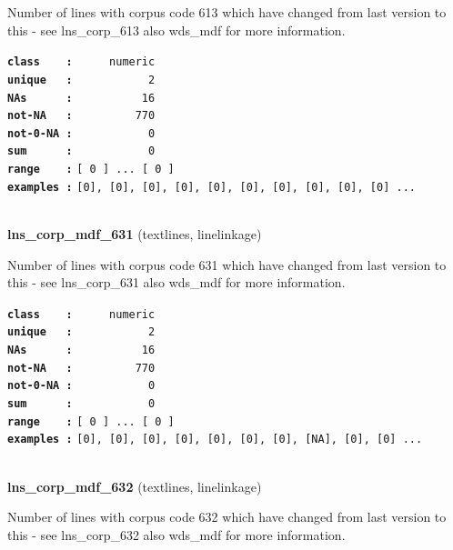 \documentclass[]{article}
\begin{document}
Number of lines with corpus code 613 which have changed from last
version to this - see lns\_corp\_613 also wds\_mdf for more information.

\textbf{\texttt{class\ \ \ \ :}} \texttt{~~~~~numeric}\\
\textbf{\texttt{unique\ \ \ :}} \texttt{~~~~~~~~~~~2}\\
\textbf{\texttt{NAs\ \ \ \ \ \ :}} \texttt{~~~~~~~~~~16}\\
\textbf{\texttt{not-NA\ \ \ :}} \texttt{~~~~~~~~~770}\\
\textbf{\texttt{not-0-NA\ :}} \texttt{~~~~~~~~~~~0}\\
\textbf{\texttt{sum\ \ \ \ \ \ :}} \texttt{~~~~~~~~~~~0}\\
\textbf{\texttt{range\ \ \ \ :}}
\texttt{{[}\ 0\ {]}\ ...\ {[}\ 0\ {]}}\\
\textbf{\texttt{examples\ :}}
\texttt{{[}0{]},\ {[}0{]},\ {[}0{]},\ {[}0{]},\ {[}0{]},\ {[}0{]},\ {[}0{]},\ {[}0{]},\ {[}0{]},\ {[}0{]}\ ...}\\

~

\textbf{lns\_corp\_mdf\_631} (textlines, linelinkage)

Number of lines with corpus code 631 which have changed from last
version to this - see lns\_corp\_631 also wds\_mdf for more information.

\textbf{\texttt{class\ \ \ \ :}} \texttt{~~~~~numeric}\\
\textbf{\texttt{unique\ \ \ :}} \texttt{~~~~~~~~~~~2}\\
\textbf{\texttt{NAs\ \ \ \ \ \ :}} \texttt{~~~~~~~~~~16}\\
\textbf{\texttt{not-NA\ \ \ :}} \texttt{~~~~~~~~~770}\\
\textbf{\texttt{not-0-NA\ :}} \texttt{~~~~~~~~~~~0}\\
\textbf{\texttt{sum\ \ \ \ \ \ :}} \texttt{~~~~~~~~~~~0}\\
\textbf{\texttt{range\ \ \ \ :}}
\texttt{{[}\ 0\ {]}\ ...\ {[}\ 0\ {]}}\\
\textbf{\texttt{examples\ :}}
\texttt{{[}0{]},\ {[}0{]},\ {[}0{]},\ {[}0{]},\ {[}0{]},\ {[}0{]},\ {[}0{]},\ {[}NA{]},\ {[}0{]},\ {[}0{]}\ ...}\\

~

\textbf{lns\_corp\_mdf\_632} (textlines, linelinkage)

Number of lines with corpus code 632 which have changed from last
version to this - see lns\_corp\_632 also wds\_mdf for more information.
\end{document}
